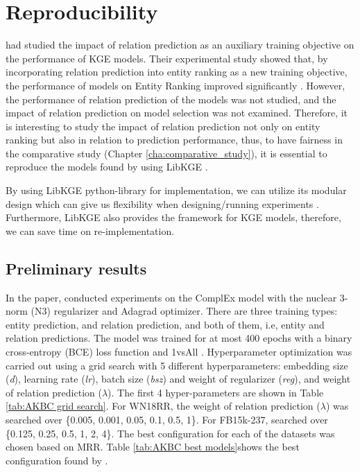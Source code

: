 
\chapter{Reproducibility}

\citet{chen2021relation} had studied the impact of relation prediction as an auxiliary training objective on the performance of KGE models. Their experimental study showed that, by incorporating relation prediction into entity ranking as a new training objective, the performance of models on Entity Ranking improved significantly \citep{chen2021relation}. However, the performance of relation prediction of the models was not studied, and the impact of relation prediction on model selection was not examined. Therefore, it is interesting to study the impact of relation prediction not only on entity ranking but also in relation to prediction performance, thus, to have fairness in the comparative study (Chapter \ref{cha:comparative_study}), it is essential to reproduce the models found by \citet{chen2021relation} using LibKGE \citep{libkge}. 

By using LibKGE \cite{libkge} python-library for implementation, we can utilize its modular design which can give us flexibility when designing/running experiments \cite{Ruffinelli2020You}. Furthermore, LibKGE also provides the framework for KGE models, therefore, we can save time on re-implementation.


\section{Preliminary results}

In the paper, \citet{chen2021relation} conducted experiments on the ComplEx model with the nuclear 3-norm (N3) regularizer and Adagrad optimizer. There are three training types: entity prediction, and relation prediction, and both of them, i.e, entity and relation predictions. The model was trained for at most 400 epochs with a binary cross-entropy (BCE) loss function and 1vsAll \citep{Ruffinelli2020You}. Hyperparameter optimization was carried out using a grid search with 5 different hyperparameters: embedding size (\textit{d}), learning rate (\textit{lr}), batch size (\textit{bsz}) and weight of regularizer (\textit{reg}), and weight of relation prediction ($\lambda$). The first 4 hyper-parameters are shown in Table \ref{tab:AKBC grid search}. For WN18RR, the weight of relation prediction ($\lambda$) was searched over \{0.005, 0.001, 0.05, 0.1, 0.5, 1\}. For FB15k-237, \citet{chen2021relation} searched over \{0.125, 0.25, 0.5, 1, 2, 4\}. The best configuration for each of the datasets was chosen based on MRR.  Table \ref{tab:AKBC best models}shows the best configuration found by \citet{chen2021relation}.


